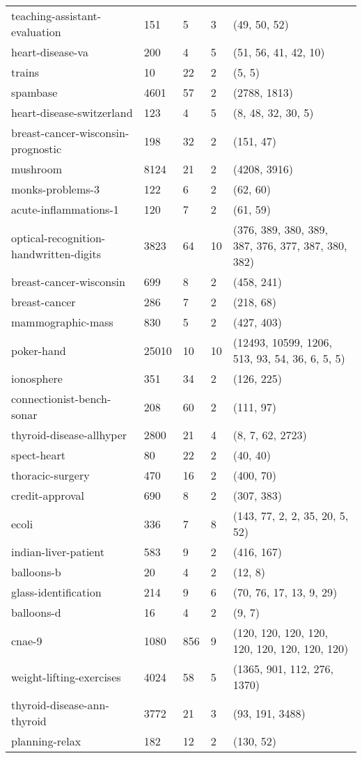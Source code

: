 \documentclass{article}%
\begin{document}
\begin{longtable}{l l l l l}
teaching{-}assistant{-}evaluation&151&5&3&(49, 50, 52)\\%
heart{-}disease{-}va&200&4&5&(51, 56, 41, 42, 10)\\%
trains&10&22&2&(5, 5)\\%
spambase&4601&57&2&(2788, 1813)\\%
heart{-}disease{-}switzerland&123&4&5&(8, 48, 32, 30, 5)\\%
breast{-}cancer{-}wisconsin{-}prognostic&198&32&2&(151, 47)\\%
mushroom&8124&21&2&(4208, 3916)\\%
monks{-}problems{-}3&122&6&2&(62, 60)\\%
acute{-}inflammations{-}1&120&7&2&(61, 59)\\%
optical{-}recognition{-}handwritten{-}digits&3823&64&10&(376, 389, 380, 389, 387, 376, 377, 387, 380, 382)\\%
breast{-}cancer{-}wisconsin&699&8&2&(458, 241)\\%
breast{-}cancer&286&7&2&(218, 68)\\%
mammographic{-}mass&830&5&2&(427, 403)\\%
poker{-}hand&25010&10&10&(12493, 10599, 1206, 513, 93, 54, 36, 6, 5, 5)\\%
ionosphere&351&34&2&(126, 225)\\%
connectionist{-}bench{-}sonar&208&60&2&(111, 97)\\%
thyroid{-}disease{-}allhyper&2800&21&4&(8, 7, 62, 2723)\\%
spect{-}heart&80&22&2&(40, 40)\\%
thoracic{-}surgery&470&16&2&(400, 70)\\%
credit{-}approval&690&8&2&(307, 383)\\%
ecoli&336&7&8&(143, 77, 2, 2, 35, 20, 5, 52)\\%
indian{-}liver{-}patient&583&9&2&(416, 167)\\%
balloons{-}b&20&4&2&(12, 8)\\%
glass{-}identification&214&9&6&(70, 76, 17, 13, 9, 29)\\%
balloons{-}d&16&4&2&(9, 7)\\%
cnae{-}9&1080&856&9&(120, 120, 120, 120, 120, 120, 120, 120, 120)\\%
weight{-}lifting{-}exercises&4024&58&5&(1365, 901, 112, 276, 1370)\\%
thyroid{-}disease{-}ann{-}thyroid&3772&21&3&(93, 191, 3488)\\%
planning{-}relax&182&12&2&(130, 52)\\%

\end{longtable}
\end{document}
